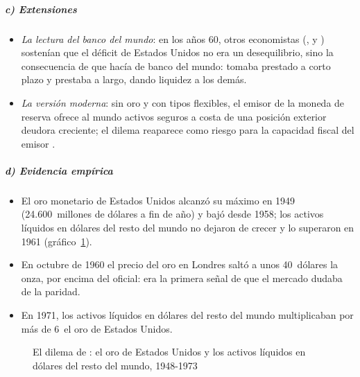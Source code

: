 \documentclass[11pt]{article}
\begin{document}
\subparagraph{c) Extensiones}

\begin{itemize}
\item \emph{La lectura del banco del mundo}: en los años 60, otros economistas (,  y ) sostenían que el déficit de Estados Unidos no era un desequilibrio, sino la consecuencia de que hacía de banco del mundo: tomaba prestado a corto plazo y prestaba a largo, dando liquidez a los demás.
\item \emph{La versión moderna}: sin oro y con tipos flexibles, el emisor de la moneda de reserva ofrece al mundo activos seguros a costa de una posición exterior deudora creciente; el dilema reaparece como riesgo para la capacidad fiscal del emisor\nocite{FarhiGourinchasRey2011} .
\end{itemize}

\subparagraph{d) Evidencia empírica}

\begin{itemize}
\item El oro monetario de Estados Unidos alcanzó su máximo en 1949 (24.600~millones de dólares a fin de año) y bajó desde 1958\nocite{Fed2026Z1FRED}; los activos líquidos en dólares del resto del mundo no dejaron de crecer y lo superaron en 1961 (gráfico~\ref{fig:triffin}).
\item En octubre de 1960 el precio del oro en Londres saltó a unos 40~dólares la onza, por encima del oficial: era la primera señal de que el mercado dudaba de la paridad.
\item En 1971, los activos líquidos en dólares del resto del mundo multiplicaban por más de 6~el oro de Estados Unidos.
\end{itemize}

\begin{figure}[H]
\centering
\caption{El dilema de : el oro de Estados Unidos y los activos líquidos en dólares del resto del mundo, 1948-1973}\label{fig:triffin}
\end{figure}
\end{document}
